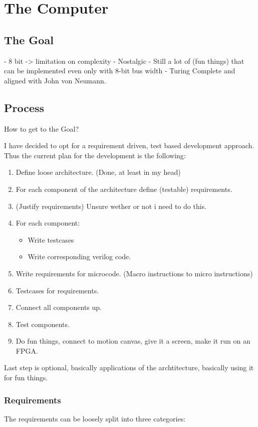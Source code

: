 \chapter{The Computer} %
\label{chap:The Computer}

\section{The Goal}

- 8 bit -> limitation on complexity
- Nostalgic
- Still a lot of (fun things) that can be implemented even only with 8-bit bus width
- Turing Complete and aligned with John von Neumann.


\section{Process}
How to get to the Goal?

I have decided to opt for a requirement driven, test based development approach. Thus the current plan for the development is the following:
\begin{enumerate}
  \item Define loose architecture. (Done, at least in my head)
  \item For each component of the architecture define (testable) requirements. 
  \item (Justify requirements) Unsure wether or not i need to do this.
  \item For each component:
  \begin{itemize}
    \item Write testcases
    \item Write corresponding verilog code.
  \end{itemize}
  \item Write requirements for microcode. (Macro instructions to micro instructions) 
  \item Testcases for requirements. 
  \item Connect all components up.
  \item Test components.
  \item Do fun things, connect to motion canvas, give it a screen, make it run on an FPGA.
\end{enumerate}

Last step is optional, basically applications of the archtitecture, basically using it for fun things. 


\subsection{Requirements}
The requirements can be loosely split into three categories:

